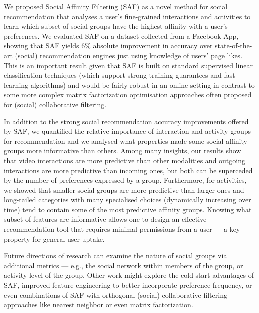 
We proposed Social Affinity Filtering (SAF) as a novel method for social
recommendation that analyses a user's fine-grained interactions and
activities to learn which subset of social groups have the highest affinity with
a user's preferences.  We evaluated SAF on a dataset collected from a
Facebook App, showing that SAF yields 6\% absolute improvement in
accuracy over state-of-the-art (social) recommendation engines just
using knowledge of users' page likes.  This is an important result
given that SAF is built on standard supervised linear classification
techniques (which support strong training guarantees and fast learning
algorithms) and would be fairly robust in an online setting 
in contrast to some more complex matrix factorization optimisation approaches
often proposed for (social) collaborative filtering.

In addition to the strong social recommendation accuracy improvements
offered by SAF, we quantified the relative importance of interaction
and activity groups for recommendation and we analysed what properties
made some social affinity groups more informative than others.  Among
many insights, our results show that video interactions are more
predictive than other modalities and outgoing interactions are more
predictive than incoming ones, but both can be superceded by the
number of preferences expressed by a group.  Furthermore, for
activities, we showed that smaller social groups are more predictive
than larger ones and long-tailed categories with many specialised
choices (dynamically increasing over time) tend to contain some of
the most predictive affinity groups.  Knowing what subset of features
are informative allows one to design an effective recommendation tool
that requires minimal permissions from a user --- a key property for
general user uptake.

Future directions of research can 
examine the nature of social groups via additional metrics --- e.g.,
the social network within members of the group, or activity level of
the group.  Other work might explore the cold-start advantages of SAF, 
improved feature engineering to better incorporate
preference frequency, or even combinations of SAF with
orthogonal (social) collaborative filtering approaches like nearest
neighbor or even matrix factorization.

